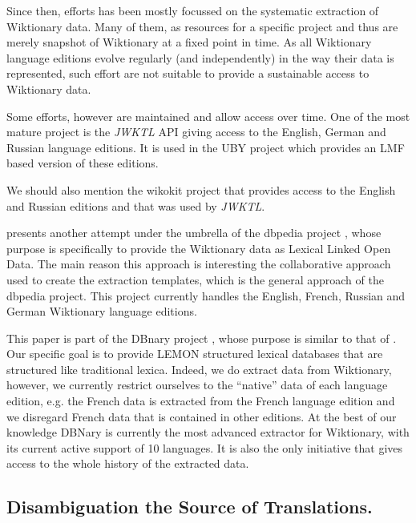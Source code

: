 \documentclass[10pt, a4paper]{article}
\begin{document}
Since then, efforts has been mostly focussed on the systematic extraction of Wiktionary data. Many of them, as resources for a specific project and thus are merely snapshot of Wiktionary at a fixed point in time. As all Wiktionary language editions evolve regularly (and independently) in the way their data is represented, such effort are not suitable to provide a sustainable access to Wiktionary data. 

Some efforts, however are maintained and allow access over time. One of the most mature project is the \emph{JWKTL} API \cite{ZeschMuellerGurevych2008} giving access to  the English, German and Russian language editions. It is used in the UBY project \cite{gurevych2012uby} which provides an LMF based version of these editions. 

We should also mention the wikokit project \cite{krizhanovsky2010transformation} that provides access to the English and Russian editions and that was used by \emph{JWKTL}.

\cite{HellmannSebastianandBrekleJonasandAuer} presents another attempt under the umbrella of the dbpedia project \cite{dbpedia-swj}, whose purpose is specifically to provide the Wiktionary data as Lexical Linked Open Data. The main reason this approach is interesting the collaborative approach used to create the extraction templates, which is the general approach of the dbpedia project. This project currently handles the English, French, Russian and German Wiktionary language editions.

This paper is part of the DBnary project \cite{serasset:dbnary-swj}, whose purpose is similar to that of \cite{HellmannSebastianandBrekleJonasandAuer}. Our specific goal is to provide LEMON structured lexical databases that are structured like traditional lexica. Indeed, we do extract data from Wiktionary, however, we currently restrict ourselves to the ``native'' data of each language edition, e.g. the French data is extracted from the French language edition and we disregard French data that is contained in other editions. At the best of our knowledge DBNary is currently the most advanced extractor for Wiktionary, with its current active support of 10 languages. It is also the only initiative that gives access to the whole history of the extracted data.

\subsection{Disambiguation the Source of Translations.} 
\end{document}
